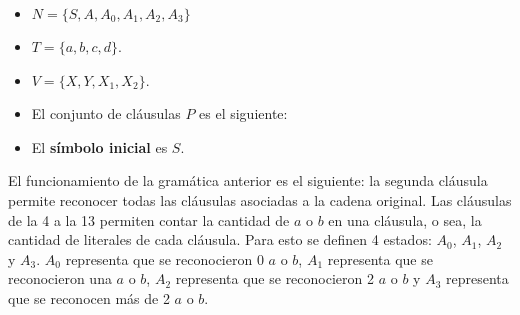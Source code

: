 \begin{itemize}
    \item $N=\{S,A,A_0,A_1,A_2,A_3\}$
    \item $T=\{a,b,c,d\}$.
    \item $V=\{X,Y,X_1,X_2\}$.
    \item El conjunto de cláusulas $P$ es el siguiente:
          \begin{enumerate}
          \end{enumerate}
    \item El \textbf{símbolo inicial} es $S$.
\end{itemize}

El funcionamiento de la gramática anterior es el siguiente: la segunda cláusula permite reconocer todas las
cláusulas asociadas a la cadena original. Las cláusulas de la 4 a la 13 permiten contar la cantidad de $a$ o $b$ en
una cláusula, o sea, la cantidad de literales de cada cláusula. Para esto se definen 4 estados: $A_0$, $A_1$, $A_2$ y $A_3$.
$A_0$ representa que se reconocieron 0 $a$ o $b$, $A_1$ representa que se reconocieron una $a$ o $b$, $A_2$
representa que se reconocieron 2 $a$ o $b$ y  $A_3$ representa que se reconocen más de 2 $a$ o $b$.

